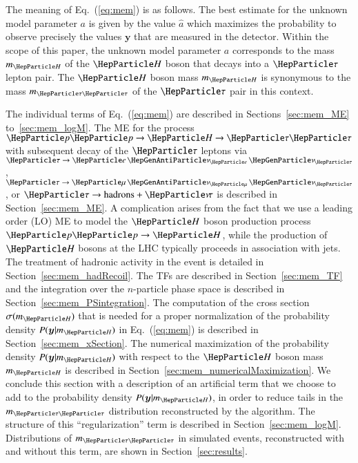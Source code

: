 The meaning of Eq.~(\ref{eq:mem}) is as follows.
The best estimate for the unknown model parameter $a$ is given by the
value $\hat{a}$ which maximizes the probability to observe precisely the 
values $\bm{y}$ that are measured in the detector. 
Within the scope of this paper, the unknown model parameter $a$
corresponds to the mass $m_{\PHiggs}$ of the $\PHiggs$ boson that decays into a $\Pgt$ lepton pair.
The $\PHiggs$ boson mass $m_{\PHiggs}$ is synonymous to the mass $m_{\Pgt\Pgt}$ of the $\Pgt$ pair in this context.

The individual terms of Eq.~(\ref{eq:mem}) are described in
Sections~\ref{sec:mem_ME} to~\ref{sec:mem_logM}.
The ME for the process $\Pp\Pp \to \PHiggs \to \Pgt\Pgt$
with subsequent decay of the $\Pgt$ leptons 
via $\Pgt \to \enunu$, $\Pgt \to \mununu$, or $\Pgt \to \textrm{hadrons} + \Pnut$
is described in Section~\ref{sec:mem_ME}.
A complication arises from the fact that we use a leading order (LO)
ME to model the $\PHiggs$ boson production process $\Pp\Pp \to
\PHiggs$, while the production of $\PHiggs$ bosons at the LHC typically
proceeds in association with jets.
The treatment of hadronic activity in the event is detailed in Section~\ref{sec:mem_hadRecoil}.
The TFs are described in Section~\ref{sec:mem_TF} and
the integration over the $n$-particle phase space is described in
Section~\ref{sec:mem_PSintegration}.
The computation of the cross section $\sigma(m_{\PHiggs})$ that is needed for a proper normalization of the probability density $P(\bm{y}|m_{\PHiggs})$
in Eq.~(\ref{eq:mem}) is described in Section~\ref{sec:mem_xSection}.
The numerical maximization of the probability density $P(\bm{y}|m_{\PHiggs})$
with respect to the $\PHiggs$ boson mass $m_{\PHiggs}$ is described in
Section~\ref{sec:mem_numericalMaximization}.
We conclude this section with a description of an artificial term that we
choose to add to the probability density $P(\bm{y}|m_{\PHiggs})$, in
order to reduce tails in the $m_{\Pgt\Pgt}$ distribution reconstructed
by the algorithm. The structure of this ``regularization'' term is described in
Section~\ref{sec:mem_logM}.
Distributions of $m_{\Pgt\Pgt}$ in simulated events,
reconstructed with and without this term, are shown in Section~\ref{sec:results}.



